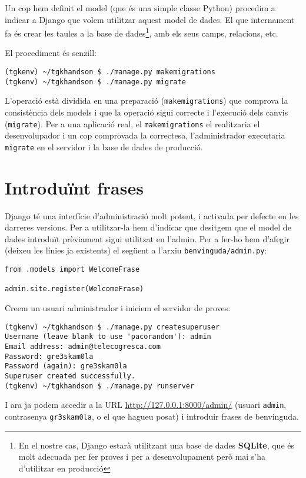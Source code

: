 \documentclass[12pt,a4paper]{article}
\begin{document}
Un cop hem definit el model (que és una simple classe Python) procedim a indicar a Django que volem utilitzar aquest model de dades. El que internament fa és crear les taules a la base de dades\footnote{En el nostre cas, Django estarà utilitzant una base de dades \textbf{SQLite}, que és molt adecuada per fer proves i per a desenvolupament però mai s'ha d'utilitzar en producció}, amb els seus camps, relacions, etc.

El procediment és senzill:

\begin{verbatim}
(tgkenv) ~/tgkhandson $ ./manage.py makemigrations
(tgkenv) ~/tgkhandson $ ./manage.py migrate
\end{verbatim}

L'operació està dividida en una preparació (\verb+makemigrations+) que comprova la consistència dels models i que la operació sigui correcte i l'execució dels canvis (\verb+migrate+). Per a una aplicació real, el \verb+makemigrations+ el realitzaria el desenvolupador i un cop comprovada la correctesa, l'administrador executaria \verb+migrate+ en el servidor i la base de dades de producció.

\section{Introduïnt frases}

Django té una interfície d'administració molt potent, i activada per defecte en les darreres versions. Per a utilitzar-la hem d'indicar que desitgem que el model de dades introduït prèviament sigui utilitzat en l'admin. Per a fer-ho hem d'afegir (deixeu les línies ja existents) el següent a l'arxiu \verb+benvinguda/admin.py+:

\begin{lstlisting}
from .models import WelcomeFrase

admin.site.register(WelcomeFrase)
\end{lstlisting}

Creem un usuari administrador i iniciem el servidor de proves:

\begin{verbatim}
(tgkenv) ~/tgkhandson $ ./manage.py createsuperuser
Username (leave blank to use 'pacorandom'): admin
Email address: admin@telecogresca.com
Password: gre3skam0la
Password (again): gre3skam0la
Superuser created successfully.
(tgkenv) ~/tgkhandson $ ./manage.py runserver
\end{verbatim}

I ara ja podem accedir a la URL \url{http://127.0.0.1:8000/admin/} (usuari \verb+admin+, contrasenya \verb+gr3skam0la+, o el que hagueu posat) i introduir frases de benvinguda.
\end{document}
